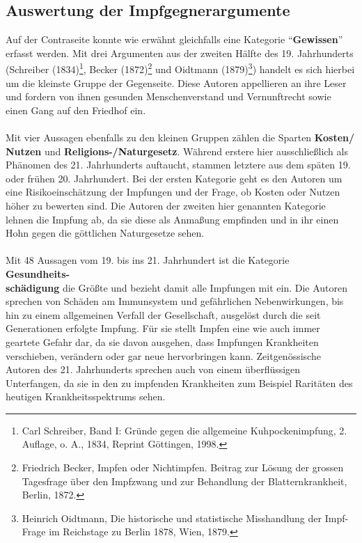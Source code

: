 \documentclass[
    a4paper,
    12pt,
    hyphens,
    chapterprefix=true,
    headheight=33pt,
    footheight=29pt,
    headings=optiontohead,
]{scrartcl}
\begin{document}
{\subsection{Auswertung der Impfgegnerargumente}
Auf der Contraseite konnte wie erwähnt gleichfalls eine Kategorie "`\textbf{Gewissen}"' erfasst werden. Mit drei Argumenten aus der zweiten Hälfte des 19. Jahrhunderts (Schreiber (1834)\footnote{Carl Schreiber, Band I: Gründe gegen die allgemeine Kuhpockenimpfung, 2. Auflage, o. A., 1834, Reprint Göttingen, 1998.}, Becker (1872)\footnote{Friedrich Becker, Impfen oder Nichtimpfen. Beitrag zur Lösung der grossen Tagesfrage über den Impfzwang und zur Behandlung der Blatternkrankheit, Berlin, 1872.} und Oidtmann (1879)\footnote{Heinrich Oidtmann, Die historische und statistische Misshandlung der Impf-Frage im Reichstage zu Berlin 1878, Wien, 1879.}) handelt es sich hierbei um die kleinste Gruppe der Gegenseite. Diese Autoren appellieren an ihre Leser und fordern von ihnen gesunden Menschenverstand und Vernunftrecht sowie einen Gang auf den Friedhof ein.\\
\\
Mit vier Aussagen ebenfalls zu den kleinen Gruppen zählen die Sparten \textbf{Kosten/\\Nutzen} und \textbf{Religions-/Naturgesetz}. Während erstere hier ausschließlich als Phänomen des 21. Jahrhunderts auftaucht, stammen letztere aus dem späten 19. oder frühen 20. Jahrhundert. Bei der ersten Kategorie geht es den Autoren um eine Risikoeinschätzung der Impfungen und der Frage, ob Kosten oder Nutzen höher zu bewerten sind. Die Autoren der zweiten hier genannten Kategorie lehnen die Impfung ab, da sie diese als Anmaßung empfinden und in ihr einen Hohn gegen die göttlichen Naturgesetze sehen.\\
\\
Mit 48 Aussagen vom 19. bis ins 21. Jahrhundert ist die Kategorie \textbf{Gesundheits-\\schädigung} die Größte  und bezieht damit alle Impfungen mit ein. Die Autoren sprechen von Schäden am Immunsystem und gefährlichen Nebenwirkungen, bis hin zu einem allgemeinen Verfall der Gesellschaft, ausgelöst durch die seit Generationen erfolgte Impfung. Für sie stellt Impfen eine wie auch immer geartete Gefahr dar, da sie davon ausgehen, dass Impfungen Krankheiten verschieben, verändern oder gar neue hervorbringen kann. Zeitgenössische Autoren des 21. Jahrhunderts sprechen auch von einem überflüssigen Unterfangen, da sie in den zu impfenden Krankheiten zum Beispiel Raritäten des heutigen Krankheitsspektrums sehen.

}
\end{document}

